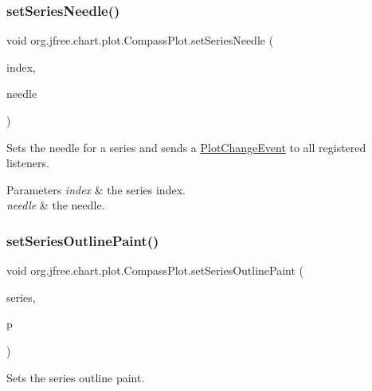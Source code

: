 \subsubsection{\texorpdfstring{set\+Series\+Needle()}{setSeriesNeedle()}\hspace{0.1cm}{\footnotesize\ttfamily [3/3]}}
{\footnotesize\ttfamily void org.\+jfree.\+chart.\+plot.\+Compass\+Plot.\+set\+Series\+Needle (\begin{DoxyParamCaption}\item[{int}]{index,  }\item[{\mbox{\hyperlink{classorg_1_1jfree_1_1chart_1_1needle_1_1_meter_needle}{Meter\+Needle}}}]{needle }\end{DoxyParamCaption})}

Sets the needle for a series and sends a \mbox{\hyperlink{}{Plot\+Change\+Event}} to all registered listeners.


\begin{DoxyParams}{Parameters}
{\em index} & the series index. \\
\hline
{\em needle} & the needle. \\
\hline
\end{DoxyParams}
\mbox{\label{classorg_1_1jfree_1_1chart_1_1plot_1_1_compass_plot_a4cc92c294efa38c6f1817ac71d48def9}} 
\subsubsection{\texorpdfstring{set\+Series\+Outline\+Paint()}{setSeriesOutlinePaint()}}
{\footnotesize\ttfamily void org.\+jfree.\+chart.\+plot.\+Compass\+Plot.\+set\+Series\+Outline\+Paint (\begin{DoxyParamCaption}\item[{int}]{series,  }\item[{Paint}]{p }\end{DoxyParamCaption})}

Sets the series outline paint.


